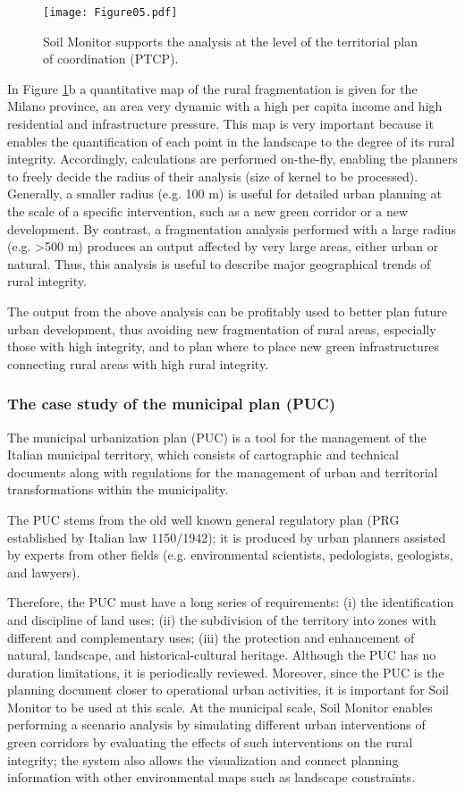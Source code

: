 \documentclass[APA,LATO1COL,doublespace]{WileyNJD-v2}
\begin{document}
\begin{figure}[t]
    \centerline{\texttt{[image: Figure05.pdf]}}
    \caption{ Soil Monitor supports the analysis at the level of the territorial plan of coordination (PTCP). } \label{fig:casePROV}
\end{figure}

In Figure \ref{fig:casePROV}b a quantitative map of the rural fragmentation is given for the Milano province, an area very dynamic with a high per capita income and high residential and infrastructure pressure. 
This map is very important because it enables the quantification of each point in the landscape to the degree of its rural integrity. 
Accordingly, calculations are performed on-the-fly, enabling the planners to freely decide the radius of their analysis (size of kernel to be processed).
Generally, a smaller radius (e.g. 100 m) is useful for detailed urban planning at the scale of a specific intervention, such as a new green corridor or a new development.
By contrast, a fragmentation analysis performed with a large radius (e.g. >500 m) produces an output affected by very large areas, either urban or natural. 
Thus, this analysis is useful to describe major geographical trends of rural integrity.

The output from the above analysis can be profitably used to better plan future urban development, thus avoiding new fragmentation of rural areas, especially those with high integrity, and to plan where to place new green infrastructures connecting rural areas with high rural integrity.

\subsubsection{The case study of the municipal plan (PUC)}
The municipal urbanization plan (PUC) is a tool for the management of the Italian municipal territory, which consists of cartographic and technical documents along with regulations for the management of urban and territorial transformations within the municipality.

The PUC stems from the old well known general regulatory plan (PRG established by Italian law 1150/1942); it is produced by urban planners assisted by experts from other fields (e.g. environmental scientists, pedologists, geologists, and lawyers).

Therefore, the PUC must have a long series of requirements: (i) the identification and discipline of land uses; (ii) the subdivision of the territory into zones with different and complementary uses; (iii) the protection and enhancement of natural, landscape, and historical-cultural heritage. 
Although the PUC has no duration limitations, it is periodically reviewed.
Moreover, since the PUC is the planning document closer to operational urban activities, it is important for Soil Monitor to be used at this scale. 
At the municipal scale, Soil Monitor enables performing a scenario analysis by simulating different urban interventions of green corridors by evaluating the effects of such interventions on the rural integrity; the system also allows the visualization and connect planning information with other environmental maps such as landscape constraints.
\end{document}
